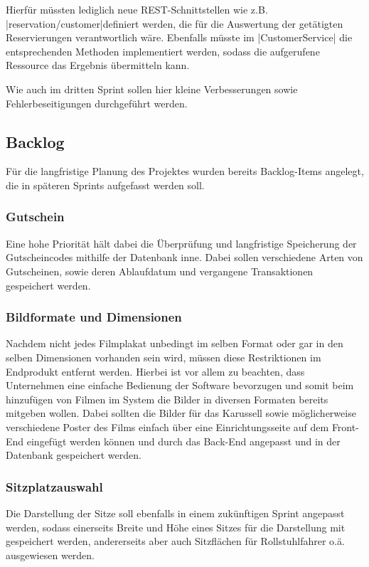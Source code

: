 Hierfür müssten lediglich neue \acs{REST}-Schnittstellen wie z.B. \jinline|reservation/customer|definiert werden, die für die Auswertung der getätigten Reservierungen verantwortlich wäre.
Ebenfalls müsste im \jinline|CustomerService| die entsprechenden Methoden implementiert werden, sodass die aufgerufene Ressource das Ergebnis übermitteln kann.

Wie auch im dritten Sprint sollen hier kleine Verbesserungen sowie Fehlerbeseitigungen durchgeführt werden.

\subsection{Backlog}
\label{ssec:backlog}
\multipleauthorsection{\authorRF}{\authorEJ}
Für die langfristige Planung des Projektes wurden bereits Backlog-Items angelegt, die in späteren Sprints aufgefasst werden soll.

\subsubsection*{Gutschein}
\label{ssssec:gutschein}
Eine hohe Priorität hält dabei die Überprüfung und langfristige Speicherung der Gutscheincodes mithilfe der Datenbank inne.
Dabei sollen verschiedene Arten von Gutscheinen, sowie deren Ablaufdatum und vergangene Transaktionen gespeichert werden.

\subsubsection*{Bildformate und Dimensionen}
\label{ssssec:bildformatedimensionen}
Nachdem nicht jedes Filmplakat unbedingt im selben Format oder gar in den selben Dimensionen vorhanden sein wird, müssen diese Restriktionen im Endprodukt entfernt werden.
Hierbei ist vor allem zu beachten, dass Unternehmen eine einfache Bedienung der Software bevorzugen und somit beim hinzufügen von Filmen im System die Bilder in diversen Formaten bereits mitgeben wollen.
Dabei sollten die Bilder für das Karussell sowie möglicherweise verschiedene Poster des Films einfach über eine Einrichtungsseite auf dem Front-End eingefügt werden können und durch das Back-End angepasst und in der Datenbank gespeichert werden.

\subsubsection*{Sitzplatzauswahl}
\label{ssssec:sitzplatzauswahl}
Die Darstellung der Sitze soll ebenfalls in einem zukünftigen Sprint angepasst werden, sodass einerseits Breite und Höhe eines Sitzes für die Darstellung mit gespeichert werden, andererseits aber auch Sitzflächen für Rollstuhlfahrer o.ä. ausgewiesen werden.

